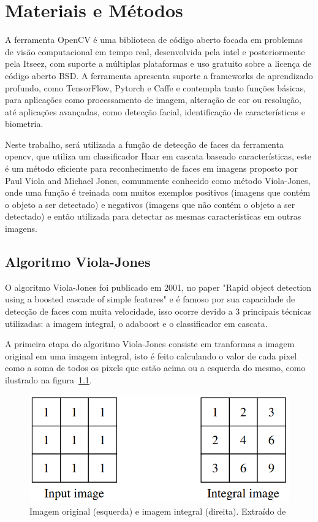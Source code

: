 \chapter{Materiais e Métodos}\label{cap:ferramentas}

A ferramenta OpenCV  é uma biblioteca de código aberto focada em problemas de visão computacional em tempo real, desenvolvida pela intel e posteriormente pela Itseez, com suporte a múltiplas plataformas e uso gratuito sobre a licença de código aberto BSD. A ferramenta apresenta suporte a frameworks de aprendizado profundo, como TensorFlow, Pytorch e Caffe  e contempla tanto funções básicas, para aplicações como processamento de imagem, alteração de cor ou resolução, até aplicações avançadas, como detecção facial, identificação de características e biometria.

Neste trabalho, será utilizada a função de detecção de faces da ferramenta opencv, que utiliza um classificador Haar em cascata baseado características, este é um método eficiente para reconhecimento de faces em imagens proposto por Paul Viola and Michael Jones, comunmente conhecido como método Viola-Jones, onde uma função é treinada com muitos exemplos positivos (imagens que contém o objeto a ser detectado) e negativos (imagens que não contém o objeto a ser detectado) e então utilizada para detectar as mesmas características em outras imagens. \cite{itseez2014theopencv}

\section{Algoritmo Viola-Jones}

O algoritmo Viola-Jones foi publicado em 2001, no paper "Rapid object detection using a boosted cascade of simple features"  e é famoso por sua capacidade de detecção de faces com muita velocidade, isso ocorre devido a 3 principais técnicas utilizadas: a imagem integral, o adaboost e o classificador em cascata.

A primeira etapa do algoritmo Viola-Jones consiste em tranformas a imagem original em uma imagem integral, isto é feito calculando o valor de cada pixel como a soma de todos os pixels que estão acima ou a esquerda do mesmo, como ilustrado na figura~\ref{fig:img-integral}.

\begin{figure}[htpb]
    \centering
    \includegraphics[scale=.3]{figs/imagem-integral.png}
    \caption{Imagem original (esquerda) e imagem integral (direita). Extraído de }
    \label{fig:img-integral}
 \end{figure}

